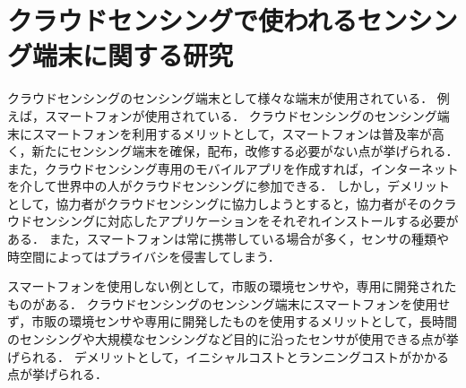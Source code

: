 \section{クラウドセンシングで使われるセンシング端末に関する研究}
\label{sec:format_abst}
クラウドセンシングのセンシング端末として様々な端末が使用されている．
例えば，スマートフォンが使用されている\cite{ura}\cite{hoso}\cite{Tangmunarunkit}\cite{ohmage}\cite{Ferreira}\cite{AWARE}．
クラウドセンシングのセンシング端末にスマートフォンを利用するメリットとして，スマートフォンは普及率が高く，新たにセンシング端末を確保，配布，改修する必要がない点が挙げられる．
また，クラウドセンシング専用のモバイルアプリを作成すれば，インターネットを介して世界中の人がクラウドセンシングに参加できる．
しかし，デメリットとして，協力者がクラウドセンシングに協力しようとすると，協力者がそのクラウドセンシングに対応したアプリケーションをそれぞれインストールする必要がある．
また，スマートフォンは常に携帯している場合が多く，センサの種類や時空間によってはプライバシを侵害してしまう．

スマートフォンを使用しない例として，市販の環境センサや，専用に開発されたものがある\cite{weko}\cite{paku}\cite{amedas}\cite{S-net}．
クラウドセンシングのセンシング端末にスマートフォンを使用せず，市販の環境センサや専用に開発したものを使用するメリットとして，長時間のセンシングや大規模なセンシングなど目的に沿ったセンサが使用できる点が挙げられる．
デメリットとして，イニシャルコストとランニングコストがかかる点が挙げられる．



